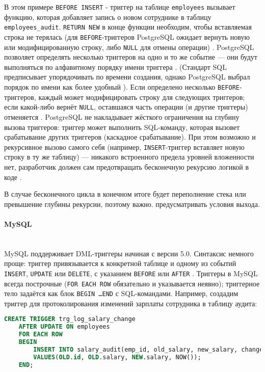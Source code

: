  В этом примере \texttt{BEFORE INSERT} - триггер на таблице \texttt{employees} вызывает функцию, которая добавляет запись о новом сотруднике в таблицу \texttt{employees\_audit}. \texttt{RETURN NEW} в конце функции необходим, чтобы вставляемая строка не терялась (для \texttt{BEFORE}-триггеров PostgreSQL ожидает вернуть новую или модифицированную строку, либо \texttt{NULL} для отмены операции)  \autocite{Postgresqltrig}. PostgreSQL позволяет определять несколько триггеров на одно и то же событие — они будут выполняться по алфавитному порядку имени триггера \autocite{Postgresqlcom}. (Стандарт SQL предписывает упорядочивать по времени создания, однако PostgreSQL выбрал порядок по имени как более удобный \autocite{Postgresqlcom}). Если определено несколько \texttt{BEFORE}-триггеров, каждый может модифицировать строку для следующих триггеров; если какой-либо вернёт \texttt{NULL}, оставшаяся часть операции (и другие триггеры) отменяется \autocite{Postgresqltrig}. PostgreSQL не накладывает жёсткого ограничения на глубину вызова триггеров: триггер может выполнить SQL-команду, которая вызовет срабатывание других триггеров (каскадное срабатывание). При этом возможно и рекурсивное вызово самого себя (например, \texttt{INSERT}-триггер вставляет новую строку в ту же таблицу) — никакого встроенного предела уровней вложенности нет, разработчик должен сам предотвращать бесконечную рекурсию логикой в коде \autocite{Postgresqltrig}. 
 
 В случае бесконечного цикла в конечном итоге будет переполнение стека или превышение глубины рекурсии, поэтому важно. предусматривать условия выхода.

\paragraph{\textbf{MySQL}} ~\\

 MySQL поддерживает DML-триггеры начиная с версии 5.0. Синтаксис немного проще: триггер привязывается к конкретной таблице и одному из событий \texttt{INSERT}, \texttt{UPDATE} или \texttt{DELETE}, с указанием \texttt{BEFORE} или \texttt{AFTER} \autocite{Mysqldoc5}. Триггеры в MySQL всегда построчные (\texttt{FOR EACH ROW} обязательно и указывается неявно); триггерное тело задаётся как блок \texttt{BEGIN \ldots END} с SQL-командами. Например, создадим триггер для протоколирования изменений зарплаты сотрудника в таблицу аудита:

 \begin{lstlisting}[language=SQL]
    CREATE TRIGGER trg_log_salary_change
    AFTER UPDATE ON employees
    FOR EACH ROW
    BEGIN
        INSERT INTO salary_audit(emp_id, old_salary, new_salary, changed_at)
        VALUES(OLD.id, OLD.salary, NEW.salary, NOW());
    END;
 \end{lstlisting}

